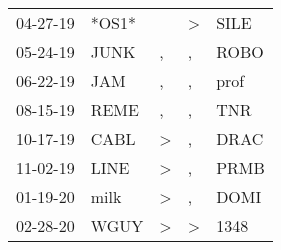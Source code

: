 \begin{supertabular}{lllll}
 04-27-19 &  *OS1* &                  &     \textgreater &   SILE \\
 05-24-19 &   JUNK &                , &                , &   ROBO \\
 06-22-19 &    JAM &                , &                , &   prof \\
 08-15-19 &   REME &                , &                , &    TNR \\
 10-17-19 &   CABL &     \textgreater &                , &   DRAC \\
 11-02-19 &   LINE &     \textgreater &                , &   PRMB \\
 01-19-20 &   milk &     \textgreater &                , &   DOMI \\
 02-28-20 &   WGUY &     \textgreater &     \textgreater &   1348 \\
\end{supertabular}
